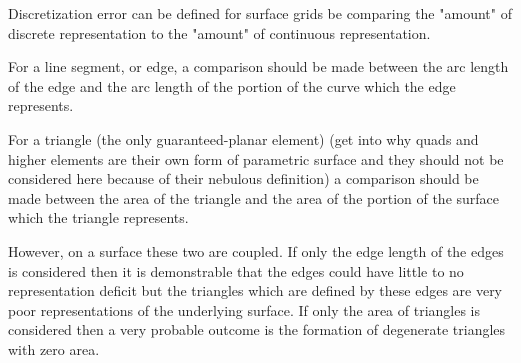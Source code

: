 Discretization error can be defined for surface grids be comparing the "amount" of discrete representation to the "amount" of continuous representation.

For a line segment, or edge, a comparison should be made between the arc length of the edge and the arc length of the portion of the curve which the edge represents.

For a triangle (the only guaranteed-planar element) (get into why quads and higher elements are their own form of parametric surface and they should not be considered here because of their nebulous definition) a comparison should be made between the area of the triangle and the area of the portion of the surface which the triangle represents.

However, on a surface these two are coupled. If only the edge length of the edges is considered then it is demonstrable that the edges could have little to no representation deficit but the triangles which are defined by these edges are very poor representations of the underlying surface. If only the area of triangles is considered then a very probable outcome is the formation of degenerate triangles with zero area.

